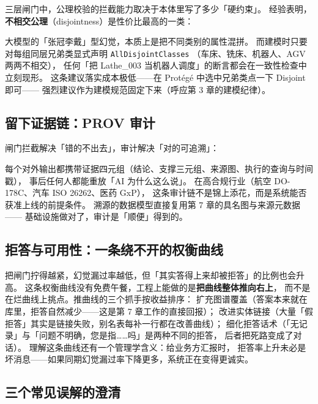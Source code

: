 三层闸门中，公理校验的拦截能力取决于本体里写了多少「硬约束」。
经验表明，\textbf{不相交公理}（disjointness）是性价比最高的一类：



大模型的「张冠李戴」型幻觉，本质上是把不同类别的属性混拼。
而建模时只要对每组同层兄弟类显式声明 \texttt{AllDisjointClasses}
（车床、铣床、机器人、AGV 两两不相交），
任何「把 Lathe\_003 当机器人调度」的断言都会在一致性检查中立刻现形。
这条建议落实成本极低——在 Protégé 中选中兄弟类点一下 Disjoint 即可——
强烈建议作为建模规范固定下来（呼应第 3 章的建模纪律）。

\subsection{留下证据链：PROV 审计}

闸门拦截解决「错的不出去」，审计解决「对的可追溯」：



每个对外输出都携带证据四元组（结论、支撑三元组、来源图、执行的查询与时间戳），
事后任何人都能重放「AI 为什么这么说」。
在高合规行业（航空 DO-178C、汽车 ISO 26262、医药 GxP），
这条审计链不是锦上添花，而是系统能否获准上线的前提条件。
溯源的数据模型直接复用第 7 章的具名图与来源元数据——
基础设施做对了，审计是「顺便」得到的。

\subsection{拒答与可用性：一条绕不开的权衡曲线}

把闸门拧得越紧，幻觉漏过率越低，但「其实答得上来却被拒答」的比例也会升高。
这条权衡曲线没有免费午餐，工程上能做的是\textbf{把曲线整体推向右上}，
而不是在烂曲线上挑点。推曲线的三个抓手按收益排序：
扩充图谱覆盖（答案本来就在库里，拒答自然减少——这是第 7 章工作的直接回报）；
改进实体链接（大量「假拒答」其实是链接失败，别名表每补一行都在改善曲线）；
细化拒答话术（「无记录」与「问题不明确，您是指……吗」是两种不同的拒答，
后者把死路变成了对话）。
理解这条曲线还有一个管理学含义：给业务方汇报时，
拒答率上升未必是坏消息——如果同期幻觉漏过率下降更多，系统正在变得更诚实。

\subsection{三个常见误解的澄清}

